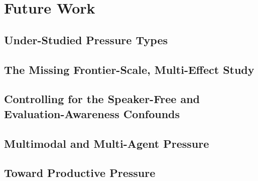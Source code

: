 \section{Future Work}
\label{sec:future_work}

\subsection{Under-Studied Pressure Types}

\subsection{The Missing Frontier-Scale, Multi-Effect Study}

\subsection{Controlling for the Speaker-Free and Evaluation-Awareness Confounds}

\subsection{Multimodal and Multi-Agent Pressure}

\subsection{Toward Productive Pressure}
